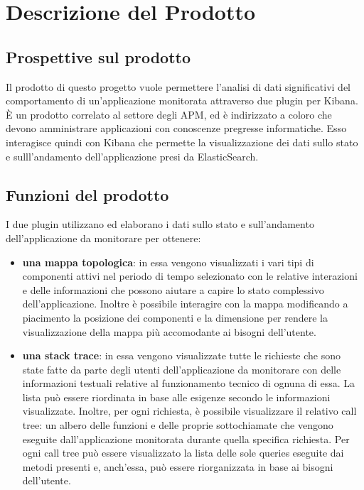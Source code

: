 \section{Descrizione del Prodotto}
	\subsection{Prospettive sul prodotto}
	Il prodotto di questo progetto vuole permettere l'analisi di dati significativi del comportamento di un'applicazione monitorata attraverso due plugin per Kibana.
	È un prodotto correlato al settore degli APM, ed è indirizzato a coloro che devono amministrare applicazioni con conoscenze pregresse informatiche. Esso interagisce quindi con Kibana che permette la visualizzazione dei dati sullo stato e sulll'andamento dell'applicazione presi da ElasticSearch.
	\subsection{Funzioni del prodotto}
	I due plugin utilizzano ed elaborano i dati sullo stato e sull'andamento dell'applicazione da monitorare per ottenere:
	\begin{itemize}
		\item 	\textbf{una mappa topologica}: in essa vengono visualizzati i vari tipi di componenti attivi nel periodo di tempo selezionato con le relative interazioni e delle informazioni che possono aiutare a capire lo stato complessivo dell'applicazione. Inoltre è possibile interagire con la mappa modificando a piacimento la posizione dei componenti e la dimensione per rendere la visualizzazione della mappa più accomodante ai bisogni dell'utente.
		\item \textbf{una stack trace}: in essa vengono visualizzate tutte le richieste che sono state fatte da parte degli utenti dell'applicazione da monitorare con delle informazioni testuali relative al funzionamento tecnico di ognuna di essa. La lista può essere riordinata in base alle esigenze secondo le informazioni visualizzate.
		Inoltre, per ogni richiesta, è possibile visualizzare il relativo call tree: un albero delle funzioni e delle proprie sottochiamate che vengono eseguite dall'applicazione monitorata durante quella specifica richiesta. Per ogni call tree può essere visualizzato la lista delle sole queries eseguite dai metodi presenti e, anch'essa, può essere riorganizzata in base ai bisogni dell'utente.
	\end{itemize} 
